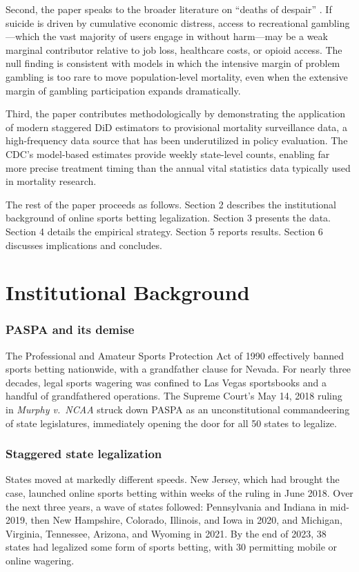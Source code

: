 \documentclass[12pt]{article}
\begin{document}
Second, the paper speaks to the broader literature on ``deaths of despair'' \citep{case2015, case2020}. If suicide is driven by cumulative economic distress, access to recreational gambling---which the vast majority of users engage in without harm---may be a weak marginal contributor relative to job loss, healthcare costs, or opioid access. The null finding is consistent with models in which the intensive margin of problem gambling is too rare to move population-level mortality, even when the extensive margin of gambling participation expands dramatically.

Third, the paper contributes methodologically by demonstrating the application of modern staggered DiD estimators to provisional mortality surveillance data, a high-frequency data source that has been underutilized in policy evaluation. The CDC's model-based estimates provide weekly state-level counts, enabling far more precise treatment timing than the annual vital statistics data typically used in mortality research.

The rest of the paper proceeds as follows. Section 2 describes the institutional background of online sports betting legalization. Section 3 presents the data. Section 4 details the empirical strategy. Section 5 reports results. Section 6 discusses implications and concludes.


\section{Institutional Background}

\subsubsection*{PASPA and its demise} The Professional and Amateur Sports Protection Act of 1990 effectively banned sports betting nationwide, with a grandfather clause for Nevada. For nearly three decades, legal sports wagering was confined to Las Vegas sportsbooks and a handful of grandfathered operations. The Supreme Court's May 14, 2018 ruling in \textit{Murphy v.\ NCAA} struck down PASPA as an unconstitutional commandeering of state legislatures, immediately opening the door for all 50 states to legalize.

\subsubsection*{Staggered state legalization} States moved at markedly different speeds. New Jersey, which had brought the case, launched online sports betting within weeks of the ruling in June 2018. Over the next three years, a wave of states followed: Pennsylvania and Indiana in mid-2019, then New Hampshire, Colorado, Illinois, and Iowa in 2020, and Michigan, Virginia, Tennessee, Arizona, and Wyoming in 2021. By the end of 2023, 38 states had legalized some form of sports betting, with 30 permitting mobile or online wagering.
\end{document}
